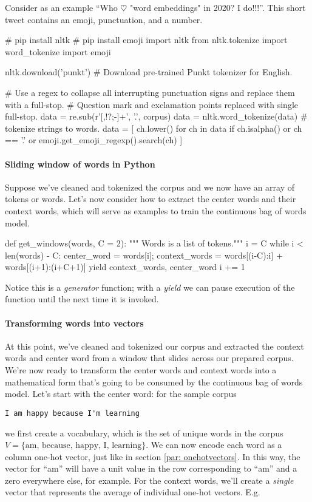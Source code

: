 \documentclass[12pt]{article}
\begin{document}
Consider as an example
``Who $\heartsuit$ "word embeddings" in 2020? I do!!!''.
This short tweet contains an emoji, punctuation, and a number.

\begin{python}
  # pip install nltk
  # pip install emoji
  import nltk
  from nltk.tokenize import word_tokenize
  import emoji

  nltk.download('punkt') # Download pre-trained Punkt tokenizer for English.

  # Use a regex to collapse all interrupting punctuation signs and replace them   with a full-stop.
  # Question mark and exclamation points replaced with single full-stop.
  data = re.sub(r'[,!?;-]+', '.', corpus)
  data = nltk.word_tokenize(data) # tokenize strings to words.
  data = [ ch.lower() for ch in data
           if ch.isalpha()
           or ch == '.'
           or emoji.get_emoji_regexp().search(ch)
         ]
\end{python}

\paragraph{Sliding window of words in Python} Suppose we've cleaned and tokenized the corpus and we now have an array of tokens or words. Let's now consider how to extract the center words and their context words, which will serve as examples to train the continuous bag of words model.

\begin{python}
def get_windows(words, C = 2):
  """ Words is a list of tokens."""  
  i = C
  while i < len(words) - C:
    center_word = words[i];
    context_words = words[(i-C):i] + words[(i+1):(i+C+1)]
    yield context_words, center_word
    i += 1
\end{python}

Notice this is a \emph{generator} function; with a \emph{yield} we can pause execution of the function until the next time it is invoked.

\paragraph{Transforming words into vectors} At this point, we've cleaned and tokenized our corpus and extracted the context words and center word from a window that slides across our prepared corpus. We're now ready to transform the center words and context words into a mathematical form that's going to be consumed by the continuous bag of words model. Let's start with the center word: for the sample corpus
\begin{verbatim}
I am happy because I'm learning
\end{verbatim}
we first create a vocabulary, which is the set of unique words in the corpus $V = \{\textrm{am, because, happy, I, learning}\}$. We can now encode each word as a column one-hot vector, just like in section \ref{par: onehotvectors}. In this way, the vector for ``am'' will have a unit value in the row corresponding to ``am'' and a zero everywhere else, for example.
For the context words, we'll create a \emph{single} vector that represents the average of individual one-hot vectors. E.g.
\end{document}
